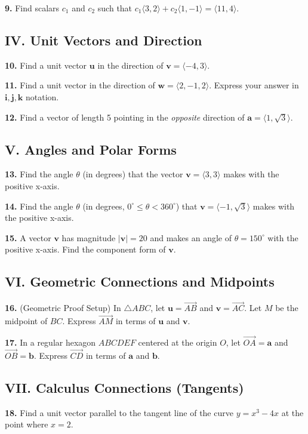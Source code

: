\documentclass[12pt]{article}
\begin{document}
\textbf{9.} Find scalars $c_1$ and $c_2$ such that $c_1\langle 3, 2 \rangle + c_2\langle 1, -1 \rangle = \langle 11, 4 \rangle$.

\subsection*{IV. Unit Vectors and Direction}
\textbf{10.} Find a unit vector $\mathbf{u}$ in the direction of $\mathbf{v} = \langle -4, 3 \rangle$.

\textbf{11.} Find a unit vector in the direction of $\mathbf{w} = \langle 2, -1, 2 \rangle$. Express your answer in $\mathbf{i}, \mathbf{j}, \mathbf{k}$ notation.

\textbf{12.} Find a vector of length 5 pointing in the \textit{opposite} direction of $\mathbf{a} = \langle 1, \sqrt{3} \rangle$.

\subsection*{V. Angles and Polar Forms}
\textbf{13.} Find the angle $\theta$ (in degrees) that the vector $\mathbf{v} = \langle 3, 3 \rangle$ makes with the positive x-axis.

\textbf{14.} Find the angle $\theta$ (in degrees, $0^\circ \le \theta < 360^\circ$) that $\mathbf{v} = \langle -1, \sqrt{3} \rangle$ makes with the positive x-axis.

\textbf{15.} A vector $\mathbf{v}$ has magnitude $|\mathbf{v}| = 20$ and makes an angle of $\theta = 150^\circ$ with the positive x-axis. Find the component form of $\mathbf{v}$.

\subsection*{VI. Geometric Connections and Midpoints}
\textbf{16.} (Geometric Proof Setup) In $\triangle ABC$, let $\mathbf{u} = \vec{AB}$ and $\mathbf{v} = \vec{AC}$. Let $M$ be the midpoint of $BC$. Express $\vec{AM}$ in terms of $\mathbf{u}$ and $\mathbf{v}$.

\textbf{17.} In a regular hexagon $ABCDEF$ centered at the origin $O$, let $\vec{OA} = \mathbf{a}$ and $\vec{OB} = \mathbf{b}$. Express $\vec{CD}$ in terms of $\mathbf{a}$ and $\mathbf{b}$.

\subsection*{VII. Calculus Connections (Tangents)}
\textbf{18.} Find a unit vector parallel to the tangent line of the curve $y = x^3 - 4x$ at the point where $x = 2$.
\end{document}
